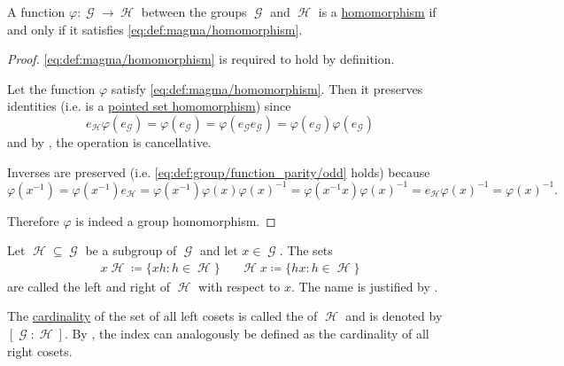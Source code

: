 \begin{proposition}\label{thm:group_homomorphism_single_condition}
  A function \( \varphi: \mscrG \to \mscrH \) between the groups \( \mscrG \) and \( \mscrH \) is a \hyperref[def:group/homomorphism]{homomorphism} if and only if it satisfies \eqref{eq:def:magma/homomorphism}.
\end{proposition}
\begin{proof}
  \SufficiencySubProof \eqref{eq:def:magma/homomorphism} is required to hold by definition.

  \NecessitySubProof Let the function \( \varphi \) satisfy \eqref{eq:def:magma/homomorphism}. Then it preserves identities (i.e. is a \hyperref[def:pointed_set/homomorphism]{pointed set homomorphism}) since
  \begin{equation*}
    e_{\mscrH} \varphi(e_{\mscrG}) = \varphi(e_{\mscrG}) = \varphi(e_{\mscrG} e_{\mscrG}) = \varphi(e_{\mscrG}) \varphi(e_{\mscrG})
  \end{equation*}
  and by , the operation is cancellative.

  Inverses are preserved (i.e. \eqref{eq:def:group/function_parity/odd} holds) because
  \begin{equation*}
    \varphi(x^{-1})
    =
    \varphi(x^{-1}) e_{\mscrH}
    =
    \varphi(x^{-1}) \varphi(x) \varphi(x)^{-1}
    =
    \varphi(x^{-1} x) \varphi(x)^{-1}
    =
    e_{\mscrH} \varphi(x)^{-1}
    =
    \varphi(x)^{-1}.
  \end{equation*}

  Therefore \( \varphi \) is indeed a group homomorphism.
\end{proof}

\begin{definition}\label{def:group_cosets}
  Let \( \mscrH \subseteq \mscrG \) be a subgroup of \( \mscrG \) and let \( x \in \mscrG \). The sets
  \begin{align*}
    x \mscrH \coloneqq \{ xh \colon h \in \mscrH \}
    &&
    \mscrH x \coloneqq \{ hx \colon h \in \mscrH \}
  \end{align*}
  are called the left and right  of \( \mscrH \) with respect to \( x \). The name is justified by .

  The \hyperref[def:cardinal]{cardinality} of the set of all left cosets is called the  of \( \mscrH \) and is denoted by \( [\mscrG : \mscrH] \). By , the index can analogously be defined as the cardinality of all right cosets.
\end{definition}


